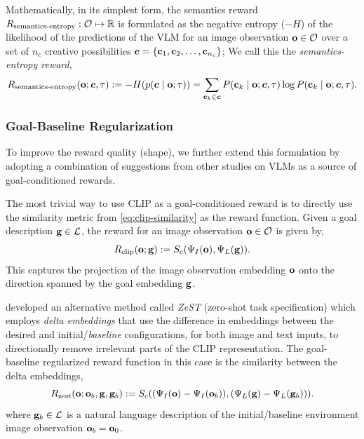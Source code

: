 Mathematically, in its simplest form, the semantics reward \(R_{\text{semantics-entropy}}: \mathcal{O} \mapsto \mathbb{R}\) is formulated as the negative entropy (\(-H\)) of the likelihood of the predictions of the VLM for an image observation \(\mathbf{o} \in \mathcal{O}\) over a set of \(n_c\) creative possibilities \(\bm{c} = \{ \mathbf{c}_1, \mathbf{c}_2, \ldots, \mathbf{c}_{n_c} \}\);
We call this the \emph{semantics-entropy reward},
\begin{equation}
    \label{eq:entropy-reward}
    R_{\text{semantics-entropy}}(\mathbf{o}; \bm{c}, \tau) := -H(p(\bm{c} \mid \mathbf{o}; \tau)) = \sum_{\mathbf{c}_k \in \bm{c}} P(\mathbf{c}_k \mid \mathbf{o}; \bm{c}, \tau) \log P(\mathbf{c}_k \mid \mathbf{o}; \bm{c}, \tau).
\end{equation}
% 
\subsubsection{Goal-Baseline Regularization}
\label{sec:goal-baseline}
To improve the reward quality (shape), we further extend this formulation by adopting a combination of suggestions from other studies on VLMs as a source of goal-conditioned rewards.

The most trivial way to use CLIP as a goal-conditioned reward is to directly use the similarity metric from \eqref{eq:clip-similarity} as the reward function.
Given a goal description \(\mathbf{g} \in \mathcal{L}\), the reward for an image observation \(\mathbf{o} \in \mathcal{O}\) is given by,
\begin{equation}
    \label{eq:trivial-reward}
    R_{\text{clip}}(\mathbf{o}; \mathbf{g}) := S_c(\Psi_I(\mathbf{o}), \Psi_L(\mathbf{g})).
\end{equation}
This captures the projection of the image observation embedding \(\mathbf{o}\) onto the direction spanned by the goal embedding \(\mathbf{g}\).

\cite{zest} developed an alternative method called \emph{ZeST} (zero-shot task specification) which employs \emph{delta embeddings} that use the difference in embeddings between the desired and initial/\emph{baseline} configurations, for both image and text inputs, to directionally remove irrelevant parts of the CLIP representation.
The goal-baseline regularized reward function in this case is the similarity between the delta embeddings,
\begin{equation}
    \label{eq:zest}
    R_{\text{zest}}(\mathbf{o}; \mathbf{o}_b, \mathbf{g}, \mathbf{g}_b) := S_c((\Psi_I(\mathbf{o}) - \Psi_I(\mathbf{o}_b)), (\Psi_L(\mathbf{g}) - \Psi_L(\mathbf{g}_b))).
\end{equation}
where \(\mathbf{g}_b \in \mathcal{L}\) is a natural language description of the initial/baseline environment image observation \(\mathbf{o}_b = \mathbf{o}_0\).

